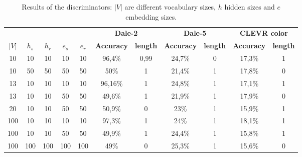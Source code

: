 \begin{table}[h]
    \centering
    \begin{tabular}{ccccc|cc|cc|cc}
        \toprule
              &         &         &         &         & \multicolumn{2}{c}{\textbf{Dale-2}} & \multicolumn{2}{c}{\textbf{Dale-5}} & \multicolumn{2}{c}{\textbf{CLEVR color}}                                                         \\\cmidrule(lr){6-7}\cmidrule(lr){8-9}\cmidrule(lr){10-11}
        $|V|$ & $h_{s}$ & $h_{r}$ & $e_{s}$ & $e_{r}$ & \textbf{Accuracy}                   & \textbf{length}                     & \textbf{Accuracy}                        & \textbf{length} & \textbf{Accuracy} & \textbf{length} \\\midrule
        {10}  & {10}    & {10}    & {10}    & {10}    & {96,4\%}                            & {0,99}                              & {24,7\%}                                 & {0}             & {17,3\%}          & {1}             \\
        {10}  & {50}    & {50}    & {50}    & {50}    & {50\%}                              & {1}                                 & {21,4\%}                                 & {1}             & {17,8\%}          & {0}             \\
        {13}  & {10}    & {10}    & {10}    & {10}    & {96,16\%}                           & {1}                                 & {24,8\%}                                 & {1}             & {17,1\%}          & {1}             \\
        {13}  & {10}    & {10}    & {50}    & {50}    & {49,6\%}                            & {1}                                 & {21,9\%}                                 & {1}             & {17,9\%}          & {0}             \\
        {20}  & {10}    & {10}    & {50}    & {50}    & {50,9\%}                            & {0}                                 & {23\%}                                   & {1}             & {15,9\%}          & {1}             \\
        {100} & {10}    & {10}    & {10}    & {10}    & {97,3\%}                            & {1}                                 & {24\%}                                   & {1}             & {18,1\%}          & {1}             \\
        {100} & {10}    & {10}    & {50}    & {50}    & {49,9\%}                            & {1}                                 & {24,4\%}                                 & {1}             & {15,8\%}          & {1}             \\
        {100} & {100}   & {100}   & {100}   & {100}   & {49\%}                              & {0}                                 & {25,3\%}                                 & {1}             & {15,6\%}          & {0}             \\
        \bottomrule
    \end{tabular}
    \caption{Results of the discriminators: $|V|$ are different vocabulary sizes, $h$ hidden sizes and $e$ embedding sizes.}
    \label{tab:results_discriminator}
\end{table}

